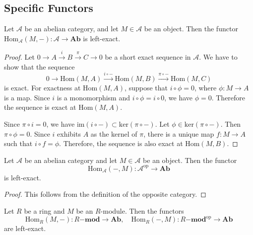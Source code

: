  \subsection{Specific Functors} %
 \label{sub:specific_functors}
 \begin{lemma}
    Let $ \mathcal{A} $ be an abelian category, and let $ M \in \mathcal{A} $ be an object. Then the functor $ \text{Hom}_{\mathcal{A}}(M, -): \mathcal{A} \to \mathbf{Ab} $ is left-exact.
 \end{lemma}
 \begin{proof}
    Let $ 0 \to A \xrightarrow{i} B \xrightarrow{\pi} C \to 0 $ be a short exact sequence in $ \mathcal{A} $. We have to show that the sequence
    \begin{equation*}
       0 \to \text{Hom}(M, A) \xrightarrow{i\circ -}\text{Hom}(M,B) \xrightarrow{\pi\circ -} \text{Hom}(M,C)
    \end{equation*}
    is exact. For exactness at $ \text{Hom}(M,A) $, suppose that $ i \circ \phi = 0 $, where $ \phi: M \to A $ is a map. Since $ i $ is a monomorphism and $ i \circ \phi = i \circ 0 $, we have $ \phi = 0 $. Therefore the sequence is exact at $ \text{Hom}(M,A) $.

    Since $ \pi \circ i = 0 $, we have $ \text{im}(i \circ -) \subset \text{ker}(\pi \circ -) $. Let $ \phi \in \text{ker}(\pi \circ -) $. Then $ \pi \circ \phi = 0 $. Since $ i $ exhibits $ A $ as the kernel of $ \pi $, there is a unique map $ f: M \to A $ such that $ i \circ f = \phi $. Therefore, the sequence is also exact at $ \text{Hom}(M, B) $.
 \end{proof}

 \begin{corollary}
    Let $ \mathcal{A} $ be an abelian category and let $ M \in \mathcal{A} $ be an object. Then the functor
    \begin{equation*}
       \text{Hom}_{\mathcal{A}}(-, M): \mathcal{A}^{\text{op}} \to \mathbf{Ab}
    \end{equation*}
    is left-exact.
 \end{corollary}
 \begin{proof}
    This follows from the definition of the opposite category.
 \end{proof}

 \begin{corollary}
    Let $ R $ be a ring and $ M $ be an $ R $-module. Then the functors
    \begin{equation*}
       \text{Hom}_R(M, -): R\mathbf{-mod} \to \mathbf{Ab},\quad \text{Hom}_R(-, M): R\mathbf{-mod}^{\text{op}} \to \mathbf{Ab}
    \end{equation*}
    are left-exact.
 \end{corollary}

